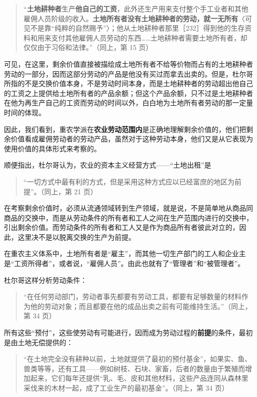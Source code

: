 \begin{quote}“\textbf{土地耕种者}生产\textbf{他自己的工资}，此外还生产用来支付整个手工业者和其他雇佣人员阶级的收入。\textbf{土地所有者没有土地耕种者的劳动，就一无所有}〈可见不是靠“纯粹的自然赐予”〉；他从土地耕种者那里［232］得到他的生存资料和用来支付其他雇佣人员劳动的东西……土地耕种者需要土地所有者，却仅仅由于习俗和法律。”（同上，第 15 页）\end{quote}

可见，在这里，剩余价值直接被描绘成土地所有者不给等价物而占有的土地耕种者劳动的一部分，因而这部分劳动的产品是他没有买过而拿去出卖的。但是，杜尔哥所指的不是交换价值本身，不是劳动时间本身，而是土地耕种者的劳动超出他自己的工资之上提供给土地所有者的产品余额；但这个产品余额，只不过是土地耕种者在他为再生产自己的工资而劳动的时间以外，白白地为土地所有者劳动的那一定量时间的体现。

因此，我们看到，重农学派在\textbf{农业劳动范围内}是正确地理解剩余价值的，他们把剩余价值看成雇佣劳动者的劳动产品，虽然对于这种劳动本身，他们又是从它表现为使用价值的具体形式来考察的。

顺便指出，杜尔哥认为，农业的资本主义经营方式——“土地出租”是

\begin{quote}“一切方式中最有利的方式，但是采用这种方式应以已经富庶的地区为前提”。（同上，第 21 页）\end{quote}

\fontbox{~\{}在考察剩余价值时，必须从流通领域转到生产领域，就是说，不是简单地从商品同商品的交换中，而是从劳动条件的所有者和工人之间在生产范围内进行的交换中，引出剩余价值。而劳动条件的所有者和工人又是作为商品所有者彼此对立的，因此，这里决不是以脱离交换的生产为前提。\fontbox{\}~}

\fontbox{~\{}在重农主义体系中，土地所有者是“雇主”，而其他一切生产部门的工人和企业主是“工资所得者”，或者说，“雇佣人员”。由此也就有了“管理者”和“被管理者”。\fontbox{\}~}

杜尔哥这样分析劳动条件：

\begin{quote}“在任何劳动部门，劳动者事先都要有劳动工具，都要有足够数量的材料作为他的劳动对象；而且都要在他的成品出卖之前有可能维持生活。”（同上，第 34 页）\end{quote}

所有这些“预付”，这些使劳动有可能进行，因而成为劳动过程的\textbf{前提}的条件，最初是由土地无偿提供的：

\begin{quote}“在土地完全没有耕种以前，土地就提供了最初的预付基金”，如果实、鱼、兽类等等，还有工具——例如树枝、石块、家畜，后者的数量由于繁殖而增加起来，它们每年还提供“乳、毛、皮和其他材料，这些产品连同从森林里采伐来的木材一起，成了工业生产的最初基金”。（同上，第 34 页）\end{quote}

